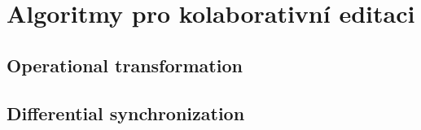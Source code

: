 
\section{Algoritmy pro kolaborativní editaci}
\subsection{Operational transformation}
\subsection{Differential synchronization}
